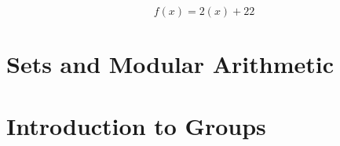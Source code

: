 \documentclass[10pt,oneside]{book}
\begin{document}
\[ f(x) = 2(x) + 22 \]  


{\let\clearpage\relax \tableofcontents} 
\newpage


\chapter{Sets and Modular Arithmetic}


\chapter{Introduction to Groups}

\end{document}
